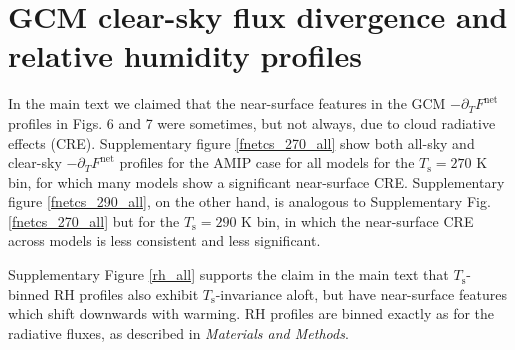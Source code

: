 \documentclass[11pt]{article}
\newcommand{\ppt}{\ensuremath{\partial_T}}
\newcommand{\FLW}{\ensuremath{F^\mathrm{LW}}}
\newcommand{\FSW}{\ensuremath{F^\mathrm{SW}}}
\newcommand{\Fnet}{\ensuremath{F^\mathrm{net}}}
\newcommand{\Ts}{\ensuremath{T_\mathrm{s}}}
\newcommand{\Tlcl}{\ensuremath{T_\mathrm{LCL}}}
\newcommand{\figurepath}{../../figures/}
\begin{document}
%
%

\section{GCM clear-sky flux divergence and relative humidity profiles}
In the main text we claimed that the near-surface features in the GCM $-\ppt\Fnet$ profiles in Figs. 6 and 7 were sometimes, but not always, due to cloud radiative effects (CRE). Supplementary figure \ref{fnetcs_270_all} show both all-sky and clear-sky $-\ppt\Fnet$ profiles for the AMIP case for all models for the $\Ts=270$ K bin, for which many models show a significant near-surface CRE. Supplementary figure \ref{fnetcs_290_all}, on the other hand, is analogous to Supplementary Fig. \ref{fnetcs_270_all} but for the $\Ts=290$ K bin, in which the near-surface CRE across models is less consistent and  less significant. 

Supplementary Figure \ref{rh_all} supports the claim in the main text that \Ts-binned RH profiles also exhibit \Ts-invariance aloft, but have near-surface features which shift downwards with warming. RH profiles are binned exactly as for the radiative fluxes, as described in \emph{Materials and Methods}.
 
\end{document}
